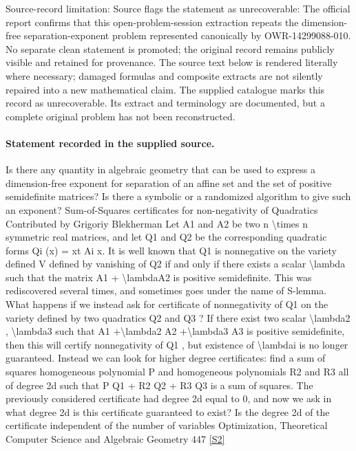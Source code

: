 \documentclass[11pt]{article}
\begin{document}
Source-record limitation: Source flags the statement as unrecoverable: The official report confirms that this open-problem-session extraction repeats the dimension-free separation-exponent problem represented canonically by OWR-14299088-010. No separate clean statement is promoted; the original record remains publicly visible and retained for provenance.
The source text below is rendered literally where necessary; damaged formulas and composite extracts are not silently repaired into a new mathematical claim.
The supplied catalogue marks this record as unrecoverable. Its extract and terminology are documented, but a complete original problem has not been reconstructed.
\paragraph{Statement recorded in the supplied source.}
Is there any quantity in algebraic geometry that can be used to express a dimension-free exponent for separation of an aﬃne set and the set of positive semideﬁnite matrices? Is there a symbolic or a randomized algorithm to give such an exponent? Sum-of-Squares certificates for non-negativity of Quadratics Contributed by Grigoriy Blekherman Let A1 and A2 be two n \textbackslash{}times n symmetric real matrices, and let Q1 and Q2 be the corresponding quadratic forms Qi (x) = xt Ai x. It is well known that Q1 is nonnegative on the variety deﬁned V deﬁned by vanishing of Q2 if and only if there exists a scalar \textbackslash{}lambda such that the matrix A1 + \textbackslash{}lambdaA2 is positive semideﬁnite. This was rediscovered several times, and sometimes goes under the name of S-lemma. What happens if we instead ask for certiﬁcate of nonnegativity of Q1 on the variety deﬁned by two quadratics Q2 and Q3 ? If there exist two scalar \textbackslash{}lambda2 , \textbackslash{}lambda3 such that A1 +\textbackslash{}lambda2 A2 +\textbackslash{}lambda3 A3 is positive semideﬁnite, then this will certify nonnegativity of Q1 , but existence of \textbackslash{}lambdai is no longer guaranteed. Instead we can look for higher degree certificates: ﬁnd a sum of squares homogeneous polynomial P and homogeneous polynomials R2 and R3 all of degree 2d such that P Q1 + R2 Q2 + R3 Q3 is a sum of squares. The previously considered certiﬁcate had degree 2d equal to 0, and now we ask in what degree 2d is this certiﬁcate guaranteed to exist? Is the degree 2d of the certiﬁcate independent of the number of variables Optimization, Theoretical Computer Science and Algebraic Geometry 447 \href{https://doi.org/10.4171/owr/2025/9}{[S2]}
\end{document}
